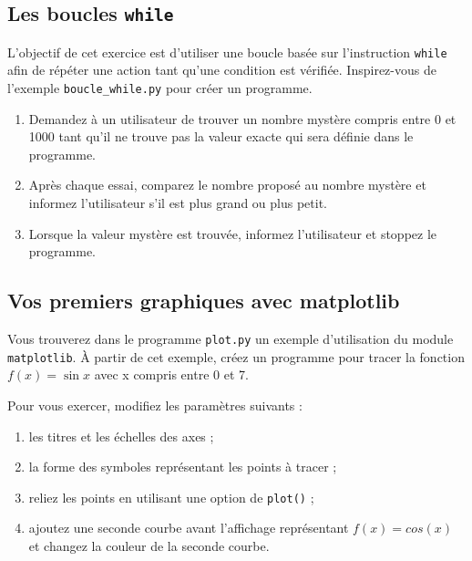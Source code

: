 \subsection{Les boucles  \texttt{while}}

L'objectif de  cet exercice  est d'utiliser une  boucle basée sur l'instruction
\texttt{while}
afin  de  répéter  une  action tant  qu'une  condition  est  vérifiée.
Inspirez-vous de  l'exemple \texttt{boucle\_while.py}  pour créer  un
programme.

\begin{enumerate}
\item Demandez à  un utilisateur de trouver un  nombre mystère compris
  entre 0 et 1000  tant qu'il ne trouve pas la  valeur exacte qui sera
  définie dans le programme.

\item  Après  chaque essai,  comparez  le  nombre proposé  au  nombre
  mystère et informez l'utilisateur s'il est plus grand ou plus petit.

\item Lorsque la valeur mystère est trouvée, informez l'utilisateur et
  stoppez le programme.

\end{enumerate}



\subsection{Vos premiers graphiques avec matplotlib}

Vous  trouverez   dans  le   programme  \texttt{plot.py}   un  exemple
d'utilisation du  module \texttt{matplotlib}. À partir  de cet exemple,
créez  un programme  pour  tracer  la fonction  $f(x)=\sin  x$ avec  x
compris entre 0 et 7.

Pour vous exercer, modifiez les paramètres suivants :

\begin{enumerate}
\item les titres et les échelles des axes ;

\item la forme des  symboles représentant les points à tracer ;

\item reliez les points en utilisant une option de \texttt{plot()} ;

\item ajoutez une seconde courbe avant l'affichage représentant $f(x)=cos(x)$ et changez la couleur
  de la seconde courbe.


\end{enumerate}


